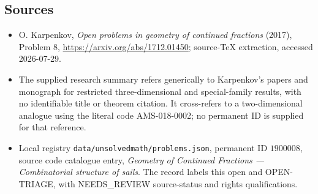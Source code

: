 \documentclass[11pt]{article}
\begin{document}
\subsection{Sources}
\begin{itemize}
\item O. Karpenkov, \emph{Open problems in geometry of continued fractions} (2017), Problem 8, \url{https://arxiv.org/abs/1712.01450}; source-TeX extraction, accessed 2026-07-29.
\item The supplied research summary refers generically to Karpenkov's papers and monograph for restricted three-dimensional and special-family results, with no identifiable title or theorem citation. It cross-refers to a two-dimensional analogue using the literal code AMS-018-0002; no permanent ID is supplied for that reference.
\item Local registry \texttt{data/unsolvedmath/problems.json}, permanent ID $1900008$, source code catalogue entry, \emph{Geometry of Continued Fractions --- Combinatorial structure of sails}. The record labels this open and OPEN-TRIAGE, with NEEDS\_REVIEW source-status and rights qualifications.
\end{itemize}
\end{document}
